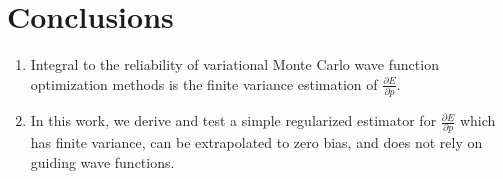 \documentclass{article}
\begin{document}
\section{Conclusions}
\begin{enumerate}
\item Integral to the reliability of variational Monte Carlo wave function optimization methods is the finite variance estimation of $\frac{\partial E}{\partial p}$.

\item  In this work, we derive and test a simple regularized estimator for $\frac{\partial E}{\partial p}$ which has finite variance, can be extrapolated to zero bias, and does not rely on guiding wave functions.
\end{enumerate}
\end{document}
